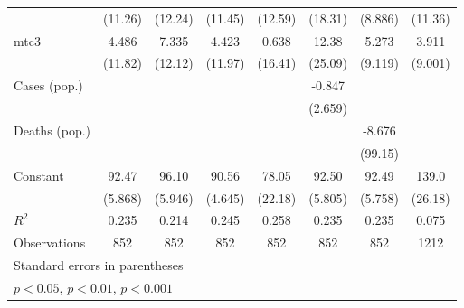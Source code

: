 \documentclass{article}
\begin{document}
{\begin{longtable}{l*{7}{c}}
                &  (11.26)         &  (12.24)         &  (11.45)         &  (12.59)         &  (18.31)         &  (8.886)         &  (11.36)         \\
mtc3            &    4.486         &    7.335         &    4.423         &    0.638         &    12.38         &    5.273         &    3.911         \\
                &  (11.82)         &  (12.12)         &  (11.97)         &  (16.41)         &  (25.09)         &  (9.119)         &  (9.001)         \\
Cases (pop.)    &                  &                  &                  &                  &   -0.847         &                  &                  \\
                &                  &                  &                  &                  &  (2.659)         &                  &                  \\
Deaths (pop.)   &                  &                  &                  &                  &                  &   -8.676         &                  \\
                &                  &                  &                  &                  &                  &  (99.15)         &                  \\
Constant        &    92.47\sym{***}&    96.10\sym{***}&    90.56\sym{***}&    78.05\sym{*}  &    92.50\sym{***}&    92.49\sym{***}&    139.0\sym{**} \\
                &  (5.868)         &  (5.946)         &  (4.645)         &  (22.18)         &  (5.805)         &  (5.758)         &  (26.18)         \\
\hline
\(R^{2}\)       &    0.235         &    0.214         &    0.245         &    0.258         &    0.235         &    0.235         &    0.075         \\
Observations    &      852         &      852         &      852         &      852         &      852         &      852         &     1212         \\
\hline\hline
\multicolumn{8}{l}{\footnotesize Standard errors in parentheses}\\
\multicolumn{8}{l}{\footnotesize \sym{*} \(p<0.05\), \sym{**} \(p<0.01\), \sym{***} \(p<0.001\)}\\
\end{longtable}
}
\end{document}
